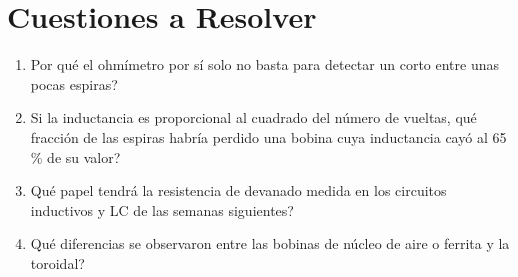 \documentclass[12pt]{article}
\begin{document}
\section{Cuestiones a Resolver}\label{sec:cuestiones}
\begin{enumerate}
  \item \textquestiondown{}Por qué el ohmímetro por sí solo no basta para detectar un corto entre unas pocas espiras?
  \item Si la inductancia es proporcional al cuadrado del número de vueltas, \textquestiondown{}qué fracción de las espiras habría perdido una bobina cuya inductancia cayó al 65 \% de su valor?
  \item \textquestiondown{}Qué papel tendrá la resistencia de devanado medida en los circuitos inductivos y LC de las semanas siguientes?
  \item \textquestiondown{}Qué diferencias se observaron entre las bobinas de núcleo de aire o ferrita y la toroidal?
\end{enumerate}

\end{document}
